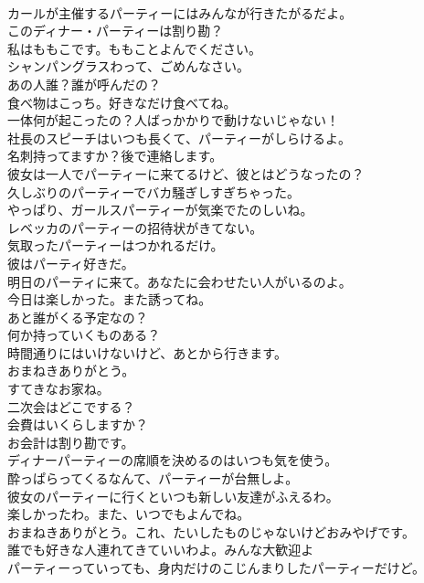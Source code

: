 \documentclass[8pt]{extreport}
\begin{document}
\begin{CJK}{UTF8}{min}
\\	カールが主催するパーティーにはみんなが行きたがるだよ。	
\\	このディナー・パーティーは割り勘？	
\\	私はももこです。ももことよんでください。	
\\	シャンパングラスわって、ごめんなさい。	
\\	あの人誰？誰が呼んだの？	
\\	食べ物はこっち。好きなだけ食べてね。	
\\	一体何が起こったの？人ばっかかりで動けないじゃない！	
\\	社長のスピーチはいつも長くて、パーティーがしらけるよ。	
\\	名刺持ってますか？後で連絡します。	
\\	彼女は一人でパーティーに来てるけど、彼とはどうなったの？	
\\	久しぶりのパーティーでバカ騒ぎしすぎちゃった。	
\\	やっぱり、ガールスパーティーが気楽でたのしいね。	
\\	レベッカのパーティーの招待状がきてない。	
\\	気取ったパーティーはつかれるだけ。	
\\	彼はパーティ好きだ。	
\\	明日のパーティに来て。あなたに会わせたい人がいるのよ。	
\\	今日は楽しかった。また誘ってね。	
\\	あと誰がくる予定なの？	
\\	何か持っていくものある？	
\\	時間通りにはいけないけど、あとから行きます。	
\\	おまねきありがとう。	
\\	すてきなお家ね。	
\\	二次会はどこでする？	
\\	会費はいくらしますか？	
\\	お会計は割り勘です。	
\\	ディナーパーティーの席順を決めるのはいつも気を使う。	
\\	酔っぱらってくるなんて、パーティーが台無しよ。	
\\	彼女のパーティーに行くといつも新しい友達がふえるわ。	
\\	楽しかったわ。また、いつでもよんでね。	
\\	おまねきありがとう。これ、たいしたものじゃないけどおみやげです。	
\\	誰でも好きな人連れてきていいわよ。みんな大歓迎よ	
\\	パーティーっていっても、身内だけのこじんまりしたパーティーだけど。	

\end{CJK}
\end{document}
